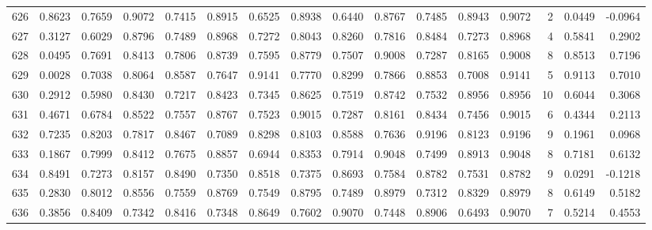 \begin{tabular}{lrrrrrrrrrrrrrrr}
626 &      0.8623 &  0.7659 &  0.9072 &  0.7415 &  0.8915 &  0.6525 &  0.8938 &  0.6440 &  0.8767 &  0.7485 &   0.8943 &     0.9072 &      2 &                    0.0449 &                    -0.0964 \\
627 &      0.3127 &  0.6029 &  0.8796 &  0.7489 &  0.8968 &  0.7272 &  0.8043 &  0.8260 &  0.7816 &  0.8484 &   0.7273 &     0.8968 &      4 &                    0.5841 &                     0.2902 \\
628 &      0.0495 &  0.7691 &  0.8413 &  0.7806 &  0.8739 &  0.7595 &  0.8779 &  0.7507 &  0.9008 &  0.7287 &   0.8165 &     0.9008 &      8 &                    0.8513 &                     0.7196 \\
629 &      0.0028 &  0.7038 &  0.8064 &  0.8587 &  0.7647 &  0.9141 &  0.7770 &  0.8299 &  0.7866 &  0.8853 &   0.7008 &     0.9141 &      5 &                    0.9113 &                     0.7010 \\
630 &      0.2912 &  0.5980 &  0.8430 &  0.7217 &  0.8423 &  0.7345 &  0.8625 &  0.7519 &  0.8742 &  0.7532 &   0.8956 &     0.8956 &     10 &                    0.6044 &                     0.3068 \\
631 &      0.4671 &  0.6784 &  0.8522 &  0.7557 &  0.8767 &  0.7523 &  0.9015 &  0.7287 &  0.8161 &  0.8434 &   0.7456 &     0.9015 &      6 &                    0.4344 &                     0.2113 \\
632 &      0.7235 &  0.8203 &  0.7817 &  0.8467 &  0.7089 &  0.8298 &  0.8103 &  0.8588 &  0.7636 &  0.9196 &   0.8123 &     0.9196 &      9 &                    0.1961 &                     0.0968 \\
633 &      0.1867 &  0.7999 &  0.8412 &  0.7675 &  0.8857 &  0.6944 &  0.8353 &  0.7914 &  0.9048 &  0.7499 &   0.8913 &     0.9048 &      8 &                    0.7181 &                     0.6132 \\
634 &      0.8491 &  0.7273 &  0.8157 &  0.8490 &  0.7350 &  0.8518 &  0.7375 &  0.8693 &  0.7584 &  0.8782 &   0.7531 &     0.8782 &      9 &                    0.0291 &                    -0.1218 \\
635 &      0.2830 &  0.8012 &  0.8556 &  0.7559 &  0.8769 &  0.7549 &  0.8795 &  0.7489 &  0.8979 &  0.7312 &   0.8329 &     0.8979 &      8 &                    0.6149 &                     0.5182 \\
636 &      0.3856 &  0.8409 &  0.7342 &  0.8416 &  0.7348 &  0.8649 &  0.7602 &  0.9070 &  0.7448 &  0.8906 &   0.6493 &     0.9070 &      7 &                    0.5214 &                     0.4553 \\

\end{tabular}
